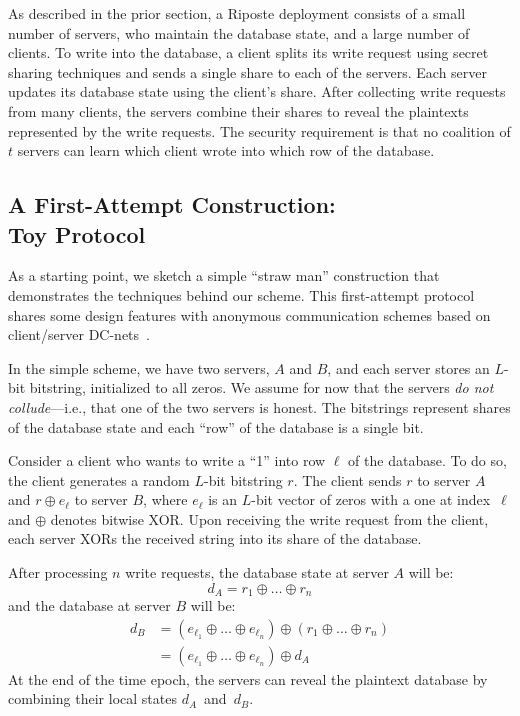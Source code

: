 \documentclass[10pt,twocolumn]{article}
\newcommand{\name}{Riposte\xspace}
\begin{document}
As described in the prior section,
a \name deployment consists of a small number
of servers, who maintain the database state, 
and a large number of clients.
To write into the database, a client
splits its write request using secret sharing
techniques and sends a single share to each of
the servers.
Each server updates its database state using
the client's share.
After collecting write requests from many
clients, the servers
combine their shares to reveal the plaintexts
represented by the write requests.
The security requirement is that 
no coalition of $t$ servers can learn which client
wrote into which row of the database.

\subsection{A First-Attempt Construction:\\Toy Protocol}
\label{sec:arch:straw}

As a starting point, we sketch a simple ``straw man''
construction that demonstrates the techniques
behind our scheme.
This first-attempt protocol shares some design features
with anonymous communication schemes based on 
client/server DC-nets~\cite{chaum1988dining,wolinsky2012dissent}.

In the simple scheme, we have two servers, $A$ and $B$,
and each server stores an $L$-bit bitstring, initialized to all zeros.
We assume for now that the servers {\em do not collude}---i.e.,
that one of the two servers is honest.
The bitstrings represent shares of the database state
and each ``row'' of the database is a single bit.

Consider a client who wants to write a ``1'' into 
row $\ell$ of the database.
To do so, the client generates a random $L$-bit bitstring $r$.
The client sends $r$ to server $A$ and $r \oplus e_\ell$ to server $B$,
where $e_\ell$ is an $L$-bit vector of zeros with a one at index~$\ell$
and $\oplus$ denotes bitwise XOR.
Upon receiving the write request from the client, each server XORs
the received string into its share of the database.

After processing $n$ write requests, the database state at
server $A$ will be:
\[ d_A = r_1 \oplus \dots \oplus r_n \]
and the database at server $B$ will be:
\begin{align*}
  d_B &= (e_{\ell_1} \oplus \dots \oplus e_{\ell_n}) \oplus (r_1 \oplus \dots \oplus r_n)\\
      &= (e_{\ell_1} \oplus \dots \oplus e_{\ell_n}) \oplus d_A
\end{align*}
At the end of the time epoch, the servers can reveal the plaintext
database by combining their local states $d_A$~and~$d_B$.
\end{document}
